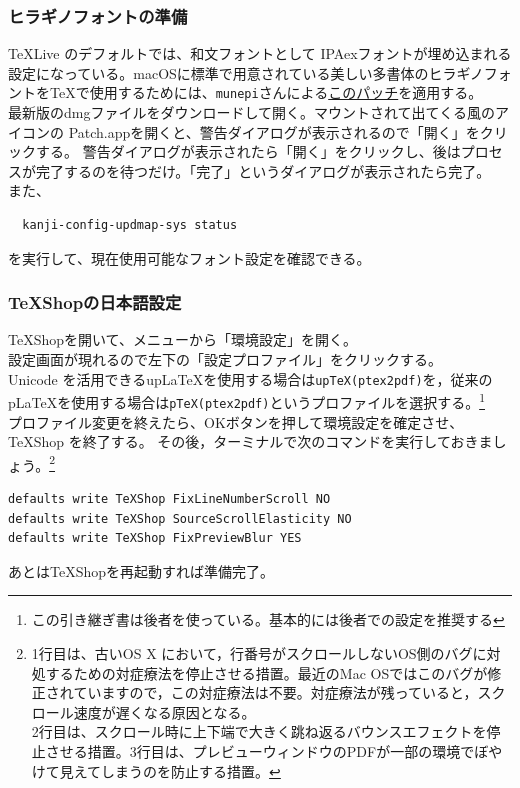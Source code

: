 \documentclass[dvipdfmx,jb5]{jreport}
\newcommand{\link}[2]{\href{#2}{#1}}
\begin{document}
\subsubsection{ヒラギノフォントの準備}
\TeX Live のデフォルトでは、和文フォントとして IPAexフォントが埋め込まれる設定になっている。macOSに標準で用意されている美しい多書体のヒラギノフォントを\TeX で使用するためには、\verb|munepi|さんによる\link{このパッチ}{https://github.com/munepi/bibunsho7-patch/releases}を適用する。\\
最新版のdmgファイルをダウンロードして開く。マウントされて出てくる風のアイコンの Patch.appを開くと、警告ダイアログが表示されるので「開く」をクリックする。
警告ダイアログが表示されたら「開く」をクリックし、後はプロセスが完了するのを待つだけ。「完了」というダイアログが表示されたら完了。\\
また、
\begin{lstlisting}
  kanji-config-updmap-sys status
  \end{lstlisting}
を実行して、現在使用可能なフォント設定を確認できる。
\subsubsection{TeXShopの日本語設定}
TeXShopを開いて、メニューから「環境設定」を開く。\\
設定画面が現れるので左下の「設定プロファイル」をクリックする。\\
Unicode を活用できるup\LaTeX を使用する場合は\texttt{upTeX(ptex2pdf)}を，従来の p\LaTeX を使用する場合は\texttt{pTeX(ptex2pdf)}というプロファイルを選択する。\footnote{この引き継ぎ書は後者を使っている。基本的には後者での設定を推奨する}\\
プロファイル変更を終えたら、OKボタンを押して環境設定を確定させ、TeXShop を終了する。
その後，ターミナルで次のコマンドを実行しておきましょう。\footnote{1行目は、古いOS X において，行番号がスクロールしないOS側のバグに対処するための対症療法を停止させる措置。最近のMac OSではこのバグが修正されていますので，この対症療法は不要。対症療法が残っていると，スクロール速度が遅くなる原因となる。\\2行目は、スクロール時に上下端で大きく跳ね返るバウンスエフェクトを停止させる措置。3行目は、プレビューウィンドウのPDFが一部の環境でぼやけて見えてしまうのを防止する措置。}
\begin{lstlisting}
defaults write TeXShop FixLineNumberScroll NO
defaults write TeXShop SourceScrollElasticity NO
defaults write TeXShop FixPreviewBlur YES
  \end{lstlisting}
あとはTeXShopを再起動すれば準備完了。
\end{document}
